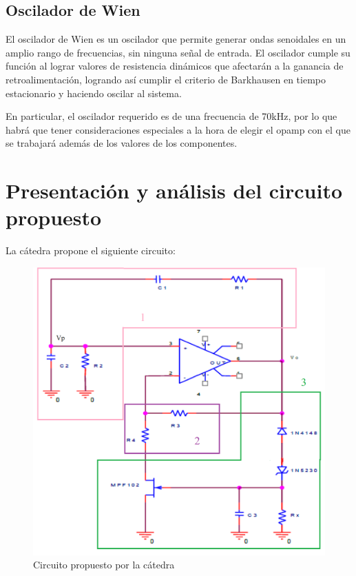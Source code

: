 \documentclass[../../tc_tp6_main.tex]{subfiles}
\begin{document}
\subsection{Oscilador de Wien}

El oscilador de Wien es un oscilador que permite generar ondas senoidales en un amplio rango de frecuencias, sin ninguna señal de entrada. El oscilador cumple su función al lograr valores de resistencia dinámicos que afectarán a la ganancia de retroalimentación, logrando así cumplir el criterio de Barkhausen en tiempo estacionario y haciendo oscilar al sistema.\par

En particular, el oscilador requerido es de una frecuencia de 70kHz, por lo que habrá que tener consideraciones especiales a la hora de elegir el opamp con el que se trabajará además de los valores de los componentes.

\section{Presentación y análisis del circuito propuesto}

La cátedra propone el siguiente circuito:

\begin{figure}[H]	
	\centering
	\includegraphics[scale=0.8]{imagenes/consigna_circuito.png}
	\caption{Circuito propuesto por la cátedra}
	\label{fig:ej1_consigna_circuito}
\end{figure}
\end{document}
